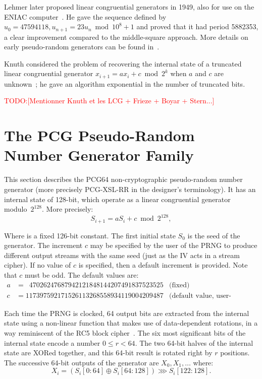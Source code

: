 \documentclass[submission,svgnames,journal=tosc]{iacrtrans}
\newcommand{\todo}[1]{\textcolor{red}{TODO:[#1]}}
\begin{document}
Lehmer later proposed linear congruential generators in 1949, also for use on
the ENIAC computer~\cite{Lehmer}. He gave the sequence defined by
$u_0 = 47594118, u_{n+1} = 23 u_n \bmod 10^8 + 1$ and proved that it had period
5882353, a clear improvement compared to the middle-square approach. More
details on early pseudo-random generators can be found in~\cite{Knuth}.

Knuth considered the problem of recovering the internal state of a truncated
linear congruential generator $x_{i+1} = ax_i + c \bmod 2^k$ when $a$ and $c$
are unknown~\cite{Knuth85}; he gave an algorithm exponential in the number of
truncated bits.

\todo{Mentionner Knuth et les LCG + Frieze + Boyar + Stern...}

\section{The PCG Pseudo-Random Number Generator Family}

This section describes the \textsf{PCG64} non-cryptographic pseudo-random number
generator (more precisely \textsf{PCG-XSL-RR} in the designer's terminology). It
has an internal state of 128-bit, which operate as a linear congruential
generator modulo~$2^{128}$. More precisely:
\[
  S_{i+1} = a S_i + c \bmod 2^{128},
\]

Where is a fixed 126-bit constant. The first initial state $S_0$ is the seed of
the generator. The increment $c$ may be specified by the user of the PRNG to
produce different output streams with the same seed (just as the IV acts in a
stream cipher). If no value of $c$ is specified, then a default increment is
provided. Note that $c$ must be odd. The default values are:
\begin{align*}
  a &= \phantom{1}47026247687942121848144207491837523525 & \text{(fixed)}\\
  c &= 117397592171526113268558934119004209487           & \text{(default value, user-definable)}
\end{align*}

Each time the PRNG is clocked, 64 output bits are extracted from the internal
state using a non-linear function that makes use of data-dependent rotations, in
a way reminiscent of the \textsf{RC5} block cipher~\cite{Rivest94}. The six most
significant bits of the internal state encode a number $0 \leq r < 64$. The two
64-bit halves of the internal state are XORed together, and this 64-bit result
is rotated right by $r$ positions. The successive 64-bit outputs of the
generator are $X_0, X_1, \dots$ where:
\begin{equation}\label{eq:output}
  X_i =(S_i[0:64] \oplus S_i[64:128]) \ggg S_i[122:128].
\end{equation}
\end{document}
